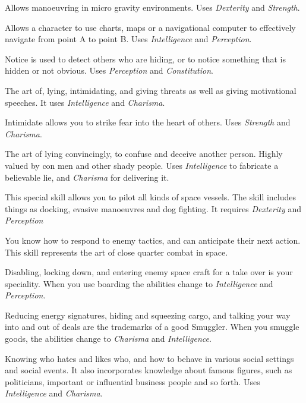 \begin{description}
   Allows manoeuvring in micro gravity environments. Uses
  \emph{Dexterity} and \emph{Strength}.

   Allows a character to use charts, maps or a navigational
  computer to effectively navigate from point A to point B. Uses \emph{Intelligence} and \emph{Perception}.

   Notice is used to detect others who are hiding, or to notice
  something that is hidden or not obvious. Uses \emph{Perception} and \emph{Constitution}.

   The art of, lying, intimidating, and giving threats as well
  as giving motivational speeches. It uses \emph{Intelligence} and \emph{Charisma}.

   Intimidate allows you to strike
  fear into the heart of others. Uses \emph{Strength} and \emph{Charisma}.

   The art of lying convincingly,
  to confuse and deceive another person. Highly valued by con men and other
  shady people. Uses \emph{Intelligence} to fabricate a believable lie, and
  \emph{Charisma} for delivering it.

   This special skill allows you to pilot all
  kinds of space vessels. The skill includes things as docking, evasive
  manoeuvres and dog fighting. It requires \emph{Dexterity} and
  \emph{Perception}

   You know how to respond to
  enemy tactics, and can anticipate their next action. This skill represents the
  art of close quarter combat in space.

   Disabling, locking down, and
  entering enemy space craft for a take over is your speciality. When you use
  boarding the abilities change to \emph{Intelligence} and \emph{Perception}.

   Reducing energy signatures,
  hiding and squeezing cargo, and talking your way into and out of deals are the
  trademarks of a good Smuggler. When you smuggle goods, the abilities change to
  \emph{Charisma} and \emph{Intelligence}.

   Knowing who hates and likes who, and how to behave in
  various social settings and social events. It also incorporates knowledge about
  famous figures, such as politicians, important or influential business people
  and so forth. Uses \emph{Intelligence} and \emph{Charisma}.


\end{description}
